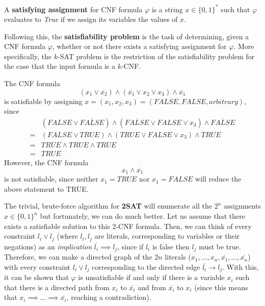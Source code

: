 \documentclass{article}
\begin{document}
  \begin{definition}
  A \textbf{satisfying assignment} for CNF formula $\varphi$ is a string $x \in \{0,1\}^*$ such that $\varphi$ evaluates to \textit{True} if we assign its variables the values of $x$. 
  \end{definition}

  Following this, the \textbf{satisfiability problem} is the task of determining, given a CNF formula $\varphi$, whether or not there exists a satisfying assignment for $\varphi$. More specifically, the $k$-SAT problem is the restriction of the satisfiability problem for the case that the input formula is a $k$-CNF. 

  \begin{example}
  The CNF formula 
  \[(x_1 \vee \overline{x_2}) \wedge (\overline{x_1} \vee x_2 \vee x_3) \wedge \overline{x_1}\]
  is satisfiable by assigning $x = (x_1, x_2, x_3) = (FALSE, FALSE, arbitrary)$, since 
  \begin{align*}
      & (FALSE \vee \overline{FALSE}) \wedge (\overline{FALSE} \vee FALSE \vee x_3) \wedge \overline{FALSE} \\
      = & (FALSE \vee TRUE) \wedge (TRUE \vee FALSE \vee x_3) \wedge TRUE \\
      = & TRUE \wedge TRUE \wedge TRUE \\
      = & TRUE
  \end{align*}
  However, the CNF formula 
  \[x_1 \wedge \overline{x_1}\]
  is not satisfiable, since neither $x_1 = TRUE$ nor $x_1 = FALSE$ will reduce the above statement to TRUE. 
  \end{example}

  The trivial, brute-force algorithm for \textbf{2SAT} will enumerate all the $2^n$ assignments $x \in \{0,1\}^n$ but fortunately, we can do much better. Let us assume that there exists a satisfiable solution to this 2-CNF formula. Then, we can think of every constraint $l_i \vee l_j$ (where $l_i, l_j$ are literals, corresponding to variables or their negations) as an \textit{implication} $\overline{l_i} \implies l_j$, since if $l_i$ is false then $l_j$ must be true. Therefore, we can make a directed graph of the $2n$ literals ($x_1, ..., x_n, \overline{x_1}, ..., \overline{x_n}$) with every constraint $l_i \vee l_j$ corresponding to the directed edge $\overline{l_i} \rightarrow l_j$. With this, it can be shown that $\varphi$ is unsatisfiable if and only if there is a variable $x_i$ such that there is a directed path from $x_i$ to $\overline{x_i}$ and from $\overline{x_i}$ to $x_i$ (since this means that $x_i \implies... \implies \overline{x_i}$, reaching a contradiction). 
\end{document}
